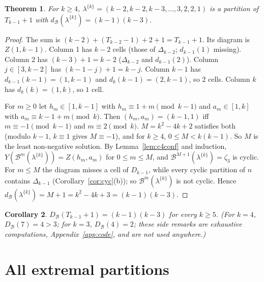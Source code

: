 \documentclass[11pt]{article}
\newtheorem{theorem}{Theorem}[section]
\newtheorem{corollary}[theorem]{Corollary}
\theoremstyle{definition}
\newcommand{\B}{\mathcal{B}}
\newcommand{\dB}{d_{\mathcal{B}}}
\newcommand{\DB}{D_{\mathcal{B}}}
\renewcommand{\le}{\leqslant}
\renewcommand{\ge}{\geqslant}
\begin{document}
\begin{theorem}\label{thm:c4lower}
For $k\ge4$, $\lambda^{\{k\}}=(k-2,k-2,k-3,\dots,3,2,2,1)$ is a partition of $T_{k-1}+1$ with
$\dB(\lambda^{\{k\}})=(k-1)(k-3)$.
\end{theorem}
\begin{proof}
The sum is $(k-2)+(T_{k-2}-1)+2+1=T_{k-1}+1$.  Its diagram is $Z(1,k-1)$.  Column 1 has $k-2$ cells (those of
$\Delta_{k-2}$; $d_{k-1}(1)$ missing).  Column 2 has $(k-3)+1=k-2$ ($\Delta_{k-2}$ and $d_{k-1}(2)$).  Column
$j\in[3,k-2]$ has $(k-1-j)+1=k-j$.  Column $k-1$ has $d_{k-1}(k-1)=(1,k-1)$ and $d_k(k-1)=(2,k-1)$, so $2$
cells.  Column $k$ has $d_k(k)=(1,k)$, so $1$ cell.

For $m\ge0$ let $h_m\in[1,k-1]$ with $h_m\equiv1+m\pmod{k-1}$ and $a_m\in[1,k]$ with $a_m\equiv k-1+m\pmod k$.
Then $(h_m,a_m)=(k-1,1)$ iff $m\equiv-1\pmod{k-1}$ and $m\equiv2\pmod k$.  $M=k^2-4k+2$ satisfies both
(modulo $k-1$, $k\equiv1$ gives $M\equiv-1$), and for $k\ge4$, $0\le M<k(k-1)$.  So $M$ is the least
non-negative solution.  By Lemma~\ref{lem:c4conf} and induction, $Y(\B^m(\lambda^{\{k\}}))=Z(h_m,a_m)$ for $0\le m\le M$,
and $\B^{M+1}(\lambda^{\{k\}})=\zeta_3$ is cyclic.  For $m\le M$ the diagram misses a cell of $D_{k-1}$, while every
cyclic partition of $n$ contains $\Delta_{k-1}$ (Corollary~\ref{cor:cyc}(b)); so $\B^m(\lambda^{\{k\}})$ is not cyclic.
Hence $\dB(\lambda^{\{k\}})=M+1=k^2-4k+3=(k-1)(k-3)$.
\end{proof}

\begin{corollary}\label{cor:c4main}
$\DB(T_{k-1}+1)=(k-1)(k-3)$ for every $k\ge5$.  (For $k=4$, $\DB(7)=4>3$; for $k=3$, $\DB(4)=2$; these side remarks are exhaustive computations,
Appendix~\ref{app:code}, and are not used anywhere.)
\end{corollary}

\section{All extremal partitions}\label{sec:c4ext}
\end{document}
